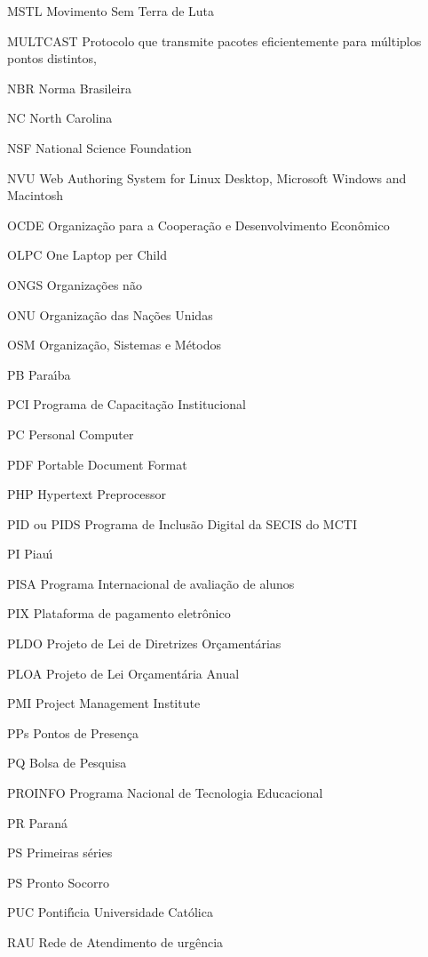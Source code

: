 \begin{siglas}
\item[MSTL]  Movimento Sem Terra de Luta
\item[MULTCAST] Protocolo que transmite pacotes eficientemente para m\'ultiplos pontos distintos,
\item[NBR] Norma Brasileira
\item[NC] North Carolina
\item[NSF] National Science Foundation
\item[NVU] Web Authoring System for Linux Desktop, Microsoft Windows and Macintosh
\item[OCDE] Organiza\c{c}\~ao para a Coopera\c{c}\~ao e Desenvolvimento Econ\^omico
\item[OLPC] One Laptop per Child 
\item[ONGS] Organiza\c{c}\~oes n\~ao
\item[ONU] Organiza\c{c}\~ao das Na\c{c}\~oes Unidas
\item[OSM] Organiza\c{c}\~ao, Sistemas e M\'etodos
\item[PB] Para\'{\i}ba
\item[PCI] Programa de Capacita\c{c}\~ao Institucional
\item[PC] Personal Computer
\item[PDF] Portable Document Format
\item[PHP] Hypertext Preprocessor
\item[PID ou PIDS] Programa de Inclus\~ao Digital da SECIS do MCTI
\item[PI] Piau\'{\i}
\item[PISA] Programa Internacional de avalia\c{c}\~ao de alunos
\item[PIX] Plataforma de pagamento eletr\^onico
\item[PLDO] Projeto de Lei de Diretrizes Or\c{c}ament\'arias
\item[PLOA] Projeto de Lei Or\c{c}ament\'aria Anual
\item[PMI] Project Management Institute
\item[PPs] Pontos de Presen\c{c}a 
\item[PQ] Bolsa de Pesquisa
\item[PROINFO] Programa Nacional de Tecnologia Educacional
\item[PR] Paran\'a
\item[PS] Primeiras s\'eries
\item[PS] Pronto Socorro
\item[PUC] Pontif\'{\i}cia Universidade Cat\'olica
\item[RAU] Rede de Atendimento de urg\^encia

\end{siglas}
